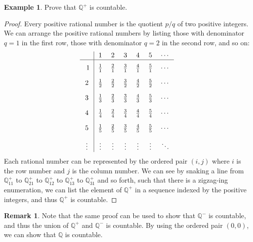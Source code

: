 \documentclass[article, 11pt]{article}
\theoremstyle{definition}
\newtheorem{example}{Example}[subsubsection]
\newtheorem*{remark}{Remark}
\newcommand{\rats}{\mathbb{Q}}
\begin{document}
    \begin{example}
        Prove that $\rats^+$ is countable.
        \begin{proof}
            Every positive rational number is the quotient $p/q$ of two positive integers. We can arrange the positive rational numbers by listing those with denominator $q=1$ in the first row, those with denominator $q=2$ in the second row, and so on:
            \begin{align*}
                \begin{tabular}{c | c c c c c c}
                      & 1           & 2           & 3           & 4           & 5           & $\cdots$ \\
                      \hline\rule{0pt}{1.2\normalbaselineskip} 
                    1 & $\frac{1}{1}$ & $\frac{2}{1}$ & $\frac{3}{1}$ & $\frac{4}{1}$ & $\frac{5}{1}$ & $\cdots$ \\[1em]
                    2 & $\frac{1}{2}$ & $\frac{2}{2}$ & $\frac{3}{2}$ & $\frac{4}{2}$ & $\frac{5}{2}$ & $\cdots$ \\[1em]
                    3 & $\frac{1}{3}$ & $\frac{2}{3}$ & $\frac{3}{3}$ & $\frac{4}{3}$ & $\frac{5}{3}$ & $\cdots$ \\[1em]
                    4 & $\frac{1}{4}$ & $\frac{2}{4}$ & $\frac{3}{4}$ & $\frac{4}{4}$ & $\frac{5}{4}$ & $\cdots$ \\[1em]
                    5 & $\frac{1}{5}$ & $\frac{2}{5}$ & $\frac{3}{5}$ & $\frac{4}{5}$ & $\frac{5}{5}$ & $\cdots$ \\[1em]
                    $\vdots$ & $\vdots$ & $\vdots$ & $\vdots$ & $\vdots$ & $\vdots$ & $\ddots$
                \end{tabular}    
            \end{align*}
            Each rational number can be represented by the ordered pair $(i,j)$ where $i$ is the row number and $j$ is the column number. We can see by snaking a line from $\rats^{+}_{11}$ to $\rats^{+}_{21}$ to $\rats^{+}_{12}$ to $\rats^{+}_{13}$ to $\rats^{+}_{31}$ and so forth, such that there is a zigzag-ing enumeration, we can list the element of $\rats^+$ in a sequence indexed by the positive integers, and thus $\rats^+$ is countable.
        \end{proof}
    \end{example}
    \begin{remark}
        Note that the same proof can be used to show that $\rats^-$ is countable, and thus the union of $\rats^+$ and $\rats^-$ is countable. By using the ordered pair $(0,0)$, we can show that $\rats$ is countable.
    \end{remark}
\end{document}

